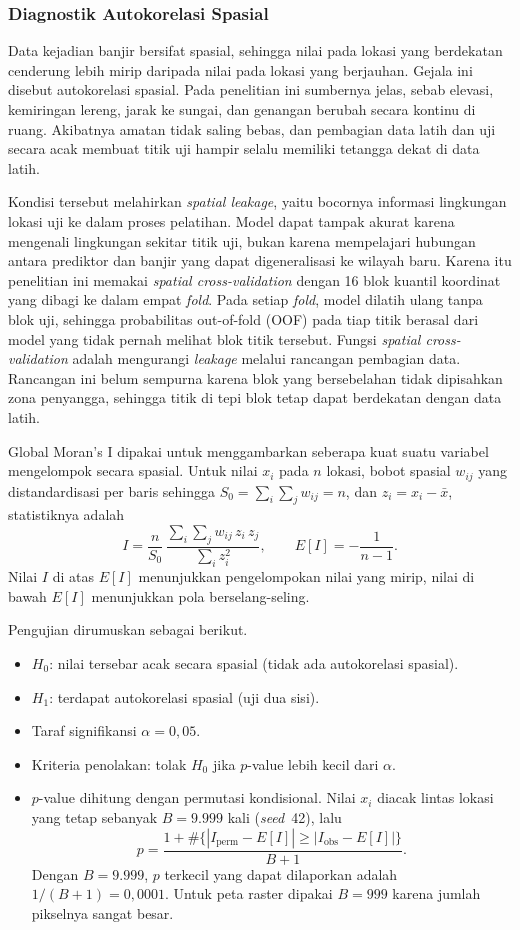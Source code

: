 \documentclass[12pt]{article}
\begin{document}
\subsubsection{Diagnostik Autokorelasi Spasial}

Data kejadian banjir bersifat spasial, sehingga nilai pada lokasi yang
berdekatan cenderung lebih mirip daripada nilai pada lokasi yang berjauhan.
Gejala ini disebut autokorelasi spasial. Pada penelitian ini sumbernya jelas,
sebab elevasi, kemiringan lereng, jarak ke sungai, dan genangan berubah
secara kontinu di ruang. Akibatnya amatan tidak saling bebas, dan pembagian
data latih dan uji secara acak membuat titik uji hampir selalu memiliki
tetangga dekat di data latih.

Kondisi tersebut melahirkan \textit{spatial leakage}, yaitu bocornya
informasi lingkungan lokasi uji ke dalam proses pelatihan. Model dapat tampak
akurat karena mengenali lingkungan sekitar titik uji, bukan karena
mempelajari hubungan antara prediktor dan banjir yang dapat digeneralisasi ke
wilayah baru. Karena itu penelitian ini memakai \textit{spatial
cross-validation} dengan 16 blok kuantil koordinat yang dibagi ke dalam empat
\textit{fold}. Pada setiap \textit{fold}, model dilatih ulang tanpa blok uji,
sehingga probabilitas out-of-fold (OOF) pada tiap titik berasal dari model
yang tidak pernah melihat blok titik tersebut. Fungsi \textit{spatial
cross-validation} adalah mengurangi \textit{leakage} melalui rancangan
pembagian data. Rancangan ini belum sempurna karena blok yang bersebelahan
tidak dipisahkan zona penyangga, sehingga titik di tepi blok tetap dapat
berdekatan dengan data latih.

Global Moran's I \cite{moran1950} dipakai untuk menggambarkan seberapa kuat
suatu variabel mengelompok secara spasial. Untuk nilai $x_i$ pada $n$ lokasi,
bobot spasial $w_{ij}$ yang distandardisasi per baris sehingga
$S_0=\sum_{i}\sum_{j}w_{ij}=n$, dan $z_i=x_i-\bar{x}$, statistiknya adalah
\[
I=\frac{n}{S_0}\,\frac{\sum_{i}\sum_{j}w_{ij}\,z_i\,z_j}{\sum_{i}z_i^{2}},
\qquad E[I]=-\frac{1}{n-1}.
\]
Nilai $I$ di atas $E[I]$ menunjukkan pengelompokan nilai yang mirip, nilai di
bawah $E[I]$ menunjukkan pola berselang-seling.

Pengujian dirumuskan sebagai berikut.
\begin{itemize}
\item $H_0$: nilai tersebar acak secara spasial (tidak ada autokorelasi
      spasial).
\item $H_1$: terdapat autokorelasi spasial (uji dua sisi).
\item Taraf signifikansi $\alpha=0{,}05$.
\item Kriteria penolakan: tolak $H_0$ jika $p$-value lebih kecil dari
      $\alpha$.
\item $p$-value dihitung dengan permutasi kondisional. Nilai $x_i$ diacak
      lintas lokasi yang tetap sebanyak $B=9.999$ kali (\textit{seed}~42),
      lalu
      \[
      p=\frac{1+\#\{|I_{\mathrm{perm}}-E[I]|\ge
      |I_{\mathrm{obs}}-E[I]|\}}{B+1}.
      \]
      Dengan $B=9.999$, $p$ terkecil yang dapat dilaporkan adalah
      $1/(B+1)=0{,}0001$. Untuk peta raster dipakai $B=999$ karena jumlah
      pikselnya sangat besar.
\end{itemize}
\end{document}
